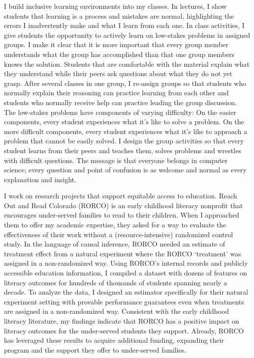 \documentclass[11pt]{article}
\begin{document}

I build inclusive learning environments into my classes.
In lectures, I show students that learning is a process and mistakes are normal, highlighting the errors I inadvertently make and what I learn from each one.
In class activities, I give students the opportunity to actively learn on low-stakes problems in assigned groups.
I make it clear that it is more important that every group member understands what the group has accomplished than that one group members knows the solution.
Students that are comfortable with the material explain what they understand while their peers ask questions about what they do not yet grasp.
After several classes in one group, I re-assign groups so that students who normally explain their reasoning can practice learning from each other and students who normally receive help can practice leading the group discussion.
The low-stakes problems have components of varying difficulty:
On the easier components, every student experiences what it's like to solve a problem.
On the more difficult components, every student experiences what it's like to approach a problem that cannot be easily solved.
I design the group activities so that every student learns from their peers and teaches them, solves problems and wrestles with difficult questions.
The message is that everyone belongs in computer science; every question and point of confusion is as welcome and normal as every explanation and insight.


I work on research projects that support equitable access to education.
Reach Out and Read Colorado (RORCO) is an early childhood literacy nonprofit that encourages under-served families to read to their children.
When I approached them to offer my academic expertise, they asked for a way to evaluate the effectiveness of their work without a (resource-intensive) randomized control study.
In the language of causal inference, RORCO needed an estimate of treatment effect from a natural experiment where the RORCO `treatment' was assigned in a non-randomized way.
Using RORCO's internal records and publicly accessible education information, I compiled a dataset with dozens of features on literacy outcomes for hundreds of thousands of students spanning nearly a decade.
To analyze the data, I designed an estimator specifically for their natural experiment setting with provable performance guarantees even when treatments are assigned in a non-randomized way.
Consistent with the early childhood literacy literature, my findings indicate that RORCO has a positive impact on literacy outcomes for the under-served students they support.
Already, RORCO has leveraged these results to acquire additional funding, expanding their program and the support they offer to under-served families.
\end{document}
